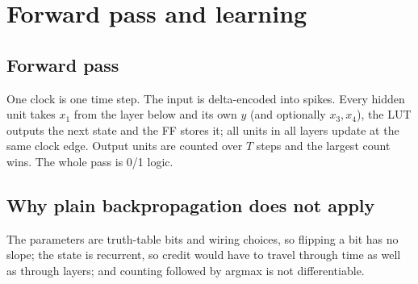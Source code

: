 \section{Forward pass and learning}
\label{sec:learning}

\subsection{Forward pass}
One clock is one time step. The input is delta-encoded into spikes. Every hidden unit takes $x_1$ from the layer below and its own $y$ (and optionally $x_3,x_4$), the LUT outputs the next state and the FF stores it; all units in all layers update at the same clock edge. Output units are counted over $T$ steps and the largest count wins. The whole pass is 0/1 logic.

\subsection{Why plain backpropagation does not apply}
The parameters are truth-table bits and wiring choices, so flipping a bit has no slope; the state is recurrent, so credit would have to travel through time as well as through layers; and counting followed by argmax is not differentiable.

